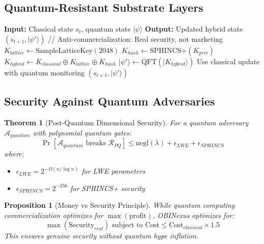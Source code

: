 \documentclass[11pt]{article}
\newtheorem{theorem}{Theorem}
\newtheorem{proposition}{Proposition}
\begin{document}
\subsection{Quantum-Resistant Substrate Layers}

\begin{algorithm}
\caption{Quantum-Secure Substrate Update}
\begin{algorithmic}
\STATE \textbf{Input:} Classical state $s_t$, quantum state $|\psi\rangle$
\STATE \textbf{Output:} Updated hybrid state $(s_{t+1}, |\psi'\rangle)$
\STATE // Anti-commercialization: Real security, not marketing
    \STATE $K_{lattice} \leftarrow \text{SampleLatticeKey}(2048)$
    \STATE $K_{hash} \leftarrow \text{SPHINCS+}(K_{priv})$
    \STATE $K_{hybrid} \leftarrow K_{classical} \oplus K_{lattice} \oplus K_{hash}$
    \STATE $|\psi'\rangle \leftarrow \text{QFT}(|K_{hybrid}\rangle)$
\ELSE
    \STATE Use classical update with quantum monitoring
\ENDIF
\RETURN $(s_{t+1}, |\psi'\rangle)$
\end{algorithmic}
\end{algorithm}

\subsection{Security Against Quantum Adversaries}

\begin{theorem}[Post-Quantum Dimensional Security]
For a quantum adversary $\mathcal{A}_{quantum}$ with polynomial quantum gates:
\[\Pr[\mathcal{A}_{quantum} \text{ breaks } \mathcal{R}_{PQ}] \leq \text{negl}(\lambda) + \epsilon_{LWE} + \epsilon_{SPHINCS}\]
where:
\begin{itemize}
    \item $\epsilon_{LWE} = 2^{-\Omega(n/\log n)}$ for LWE parameters
    \item $\epsilon_{SPHINCS} = 2^{-256}$ for SPHINCS+ security
\end{itemize}
\end{theorem}

\begin{proposition}[Money vs Security Principle]
While quantum computing commercialization optimizes for $\max(\text{profit})$, OBINexus optimizes for:
\[\max(\text{Security}_{real}) \text{ subject to } \text{Cost} \leq \text{Cost}_{classical} \times 1.5\]
This ensures genuine security without quantum hype inflation.
\end{proposition}
\end{document}
